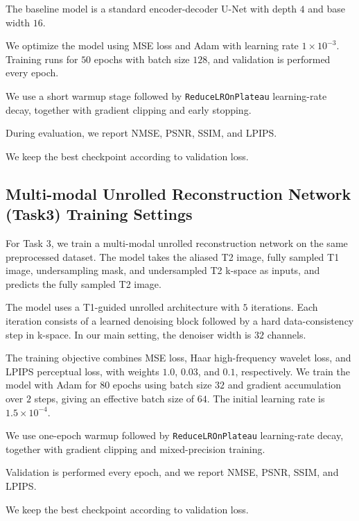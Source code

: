 The baseline model is a standard encoder-decoder U-Net with depth $4$ and base width $16$.

We optimize the model using MSE loss and Adam with learning rate $1\times10^{-3}$. Training runs for $50$ epochs with batch size $128$, and validation is performed every epoch.

We use a short warmup stage followed by \texttt{ReduceLROnPlateau} learning-rate decay, together with gradient clipping and early stopping.

During evaluation, we report NMSE, PSNR, SSIM, and LPIPS.

We keep the best checkpoint according to validation loss.

\subsection{Multi-modal Unrolled Reconstruction Network (Task3) Training Settings}
\label{sec:multimodal_unrolled_training_settings}

For Task 3, we train a multi-modal unrolled reconstruction network on the same preprocessed dataset. The model takes the aliased T2 image, fully sampled T1 image, undersampling mask, and undersampled T2 k-space as inputs, and predicts the fully sampled T2 image.

The model uses a T1-guided unrolled architecture with $5$ iterations. Each iteration consists of a learned denoising block followed by a hard data-consistency step in k-space. In our main setting, the denoiser width is $32$ channels.

The training objective combines MSE loss, Haar high-frequency wavelet loss, and LPIPS perceptual loss, with weights $1.0$, $0.03$, and $0.1$, respectively. We train the model with Adam for $80$ epochs using batch size $32$ and gradient accumulation over $2$ steps, giving an effective batch size of $64$. The initial learning rate is $1.5\times10^{-4}$.

We use one-epoch warmup followed by \texttt{ReduceLROnPlateau} learning-rate decay, together with gradient clipping and mixed-precision training.

Validation is performed every epoch, and we report NMSE, PSNR, SSIM, and LPIPS.

We keep the best checkpoint according to validation loss.
